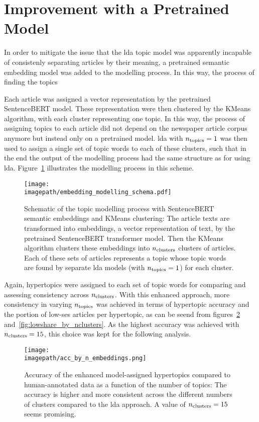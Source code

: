 \section{Improvement with a Pretrained Model}
In order to mitigate the issue that the \gls{lda} topic model was apparently incapable of consistenly separating articles by their meaning, a pretrained semantic embedding model was added to the modelling process. In this way, the process of finding the topics

Each article was assigned a vector representation by the pretrained SentenceBERT model. These representation were then clustered by the KMeans algorithm, with each cluster representing one topic. In this way, the process of assigning topics to each article did not depend on the newspaper article corpus anymore but instead only on a pretrained model. \gls{lda} with $n_\text{topics}=1$ was then used to assign a single set of topic words to each of these clusters, such that in the end the output of the modelling process had the same structure as for using \gls{lda}. Figure~\ref{fig:embedding_modelling_schema} illustrates the modelling process in this scheme.

\begin{figure}
    \centering
    \texttt{[image: \\imagepath/embedding\_modelling\_schema.pdf]}
    \caption{Schematic of the topic modelling process with SentenceBERT semantic embeddings and KMeans clustering: The article texts are transformed into embeddings, a vector representation of text, by the pretrained SentenceBERT transformer model. Then the KMeans algorithm clusters these embeddings into $n_\text{clusters}$ clusters of articles. Each of these sets of articles represents a topic whose topic words are found by separate \gls{lda} models (with $n_\text{topics}=1$) for each cluster.}\label{fig:embedding_modelling_schema}
\end{figure}

Again, hypertopics were assigned to each set of topic words for comparing and assessing consistency across $n_\text{clusters}$. With this enhanced approach, more consistency in varying $n_\text{topics}$ was achieved in terms of hypertopic accuracy and the portion of low-\gls{ses} articles per hypertopic, as can be seend from figures~\ref{fig:accuracy_by_nclusters} and~\ref{fig:lowshare_by_nclusters}. As the highest accuracy was achieved with $n_\text{clusters}=15$, this choice was kept for the following analysis. 

\begin{figure}
    \centering
    \texttt{[image: \\imagepath/acc\_by\_n\_embeddings.png]}
    \caption{Accuracy of the  enhanced model-assigned hypertopics compared to human-annotated data as a function of the number of topics: The accuracy is higher and more consistent across the different numbers of clusters compared to the \gls{lda} approach. A value of $n_\text{clusters}=15$ seems promising.}\label{fig:accuracy_by_nclusters}
\end{figure}

